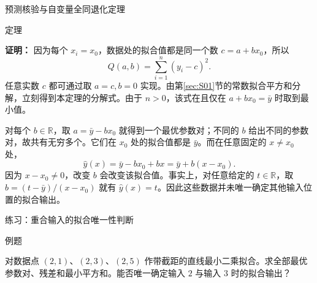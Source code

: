 \documentclass[aspectratio=169,10pt,fontset=fandol]{ctexbeamer}
\begin{document}
\begin{frame}[t,fragile]{预测核验与自变量全同退化定理}
\begin{block}{定理}
{%
}
\end{block}
\pause
{\footnotesize
\textbf{证明：}
因为每个 $x_i=x_0$，数据处的拟合值都是同一个数 $c=a+bx_0$，所以
\[
Q(a,b)=\sum_{i=1}^{n}(y_i-c)^2.
\]
任意实数 $c$ 都可通过取 $a=c,b=0$ 实现。由第\ref{sec:S01}节的常数拟合平方和分解，立刻得到本定理的分解式。由于 $n>0$，该式在且仅在 $a+bx_0=\bar{y}$ 时取到最小值。

对每个 $b\in\mathbb{R}$，取 $a=\bar{y}-bx_0$ 就得到一个最优参数对；不同的 $b$ 给出不同的参数对，故共有无穷多个。它们在 $x_0$ 处的拟合值都是 $\bar{y}$。而在任意固定的 $x\ne x_0$ 处，
\[
\hat{y}(x)=\bar{y}-bx_0+bx=\bar{y}+b(x-x_0).
\]
因为 $x-x_0\ne0$，改变 $b$ 会改变该拟合值。事实上，对任意给定的 $t\in\mathbb{R}$，取 $b=(t-\bar{y})/(x-x_0)$ 就有 $\hat{y}(x)=t$。因此这些数据并未唯一确定其他输入位置的拟合输出。

}
\end{frame}
\begin{frame}[t,fragile]{练习：重合输入的拟合唯一性判断}
\normalsize
\begin{block}{例题}
{\normalsize
对数据点 $(2,1)$、$(2,3)$、$(2,5)$ 作带截距的直线最小二乘拟合。求全部最优参数对、残差和最小平方和。能否唯一确定输入 $2$ 与输入 $3$ 时的拟合输出？

}
\end{block}
\end{frame}
\end{document}
